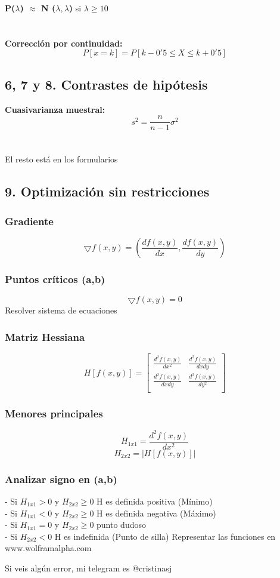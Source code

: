 \documentclass[12pt,a4paper]{report}
\begin{document}
\textbf{P($\lambda$) $\approx $ N ($\lambda, \lambda$)} si $\lambda \geqslant 10 $ 
\\\\
\\
\textbf{Corrección por continuidad: }
\[ P [x = k ] = P [k - 0'5 \leqslant X \leqslant k + 0'5] \]

\newpage
\subsection*{6, 7 y 8. Contrastes de hipótesis }
\textbf{Cuasivarianza muestral: }
\[ s ^ 2 = \frac{n}{n - 1} \sigma ^ 2 \]
\\
\\
El resto está en los formularios

\newpage
\subsection*{9. Optimización sin restricciones }
\subsubsection{Gradiente }
\[ \bigtriangledown f(x,y) = (\frac{d f(x, y)}{dx},\frac{df(x,y)}{dy}) \] 
\subsubsection{Puntos críticos (a,b) }
\[ \bigtriangledown f(x,y) = 0 \]
Resolver sistema de ecuaciones
\subsubsection{Matriz Hessiana }
\[ H [f(x,y)] =  
\left[ {\begin{array}{cc}
\frac{d^2f(x,y)}{dx^2} & \frac{d^2f(x,y)}{dxdy} \\
\frac{d^2f(x,y)}{dxdy} & \frac{d^2f(x,y)}{dy^2} \\
\end{array} } \right]
\]
\subsubsection{Menores principales}
\[ H _ {1x1} = \frac{d^2 f(x,y)}{dx^2}\]
\[ H _ {2x2} = |H [f(x,y)]|\]

\subsubsection{Analizar signo en (a,b)}
- Si $H _ {1x1} > 0 $ y $H _ {2x2} \geqslant 0$ H es definida positiva (Mínimo) 
\\
- Si $H _ {1x1} < 0 $ y $H _ {2x2} \geqslant 0$ H es definida negativa (Máximo) 
\\
- Si $H _ {1x1} = 0 $ y $H _ {2x2} \geqslant 0$ punto dudoso
\\
- Si $ H _ {2x2} < 0 $ H es indefinida (Punto de silla) 
Representar las funciones en www.wolframalpha.com

\vspace*{\fill}
Si veis algún error, mi telegram es @cristinasj 
\end{document}
